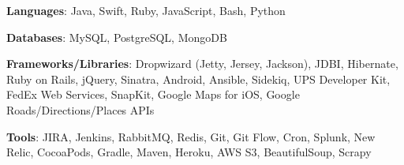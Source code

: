 \vspace{5mm}
	

\begin{cventries}
\vspace{-5mm}
  \cventry
    {}
    {}
    {}
    {}
    {
      \begin{cvitems}
        \item {\textbf{Languages}: Java, Swift, Ruby, JavaScript, Bash, Python}
        \vspace{1mm}
        \item {\textbf{Databases}: MySQL, PostgreSQL, MongoDB}
        \vspace{1mm}
        \item {\textbf{Frameworks/Libraries}: Dropwizard (Jetty, Jersey, Jackson), JDBI, Hibernate, Ruby on Rails, jQuery, Sinatra, Android, Ansible, Sidekiq, UPS Developer Kit, FedEx Web Services, SnapKit, Google Maps for iOS, Google Roads/Directions/Places APIs}
        \vspace{1mm}
        \item {\textbf{Tools}: JIRA, Jenkins, RabbitMQ, Redis, Git, Git Flow, Cron, Splunk, New Relic, CocoaPods, Gradle, Maven, Heroku, AWS S3, BeautifulSoup, Scrapy}
      \end{cvitems}
    }
\end{cventries}
